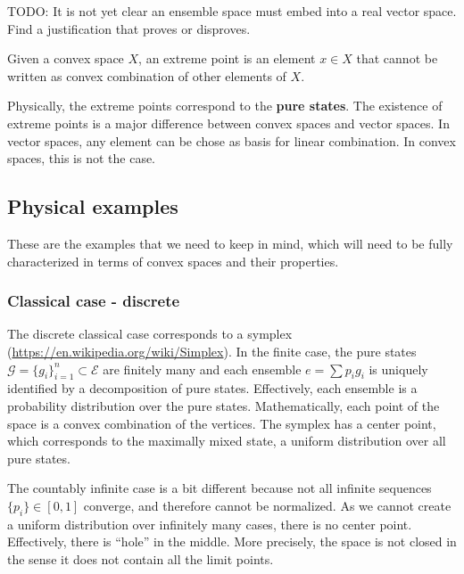 \documentclass[11pt]{article}
\begin{document}
\begin{remark}
	TODO: It is not yet clear an ensemble space must embed into a real vector space. Find a justification that proves or disproves.
\end{remark}

\begin{defn}
	Given a convex space $X$, an extreme point is an element $x \in X$ that cannot be written as convex combination of other elements of $X$.
\end{defn}

\begin{defn}
	Physically, the extreme points correspond to the \textbf{pure states}. The existence of extreme points is a major difference between convex spaces and vector spaces. In vector spaces, any element can be chose as basis for linear combination. In convex spaces, this is not the case.
\end{defn}

\subsection{Physical examples}

These are the examples that we need to keep in mind, which will need to be fully characterized in terms of convex spaces and their properties.

\subsubsection{Classical case - discrete}

The discrete classical case corresponds to a symplex (\url{https://en.wikipedia.org/wiki/Simplex}). In the finite case, the pure states $\mathcal{G} = \{g_i\}_{i=1}^{n} \subset \mathcal{E}$ are finitely many and each ensemble $e = \sum p_i g_i$ is uniquely identified by a decomposition of pure states. Effectively, each ensemble is a probability distribution over the pure states. Mathematically, each point of the space is a convex combination of the vertices. The symplex has a center point, which corresponds to the maximally mixed state, a uniform distribution over all pure states.

The countably infinite case is a bit different because not all infinite sequences $\{p_i\} \in [0,1]$ converge, and therefore cannot be normalized. As we cannot create a uniform distribution over infinitely many cases, there is no center point. Effectively, there is ``hole'' in the middle. More precisely, the space is not closed in the sense it does not contain all the limit points.
\end{document}
